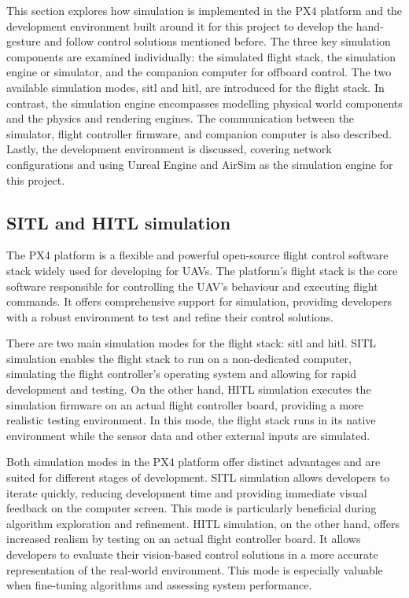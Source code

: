 This section explores how simulation is implemented in the PX4 platform and the development environment built around it for this project to develop the hand-gesture and follow control solutions mentioned before.
The three key simulation components are examined individually: the simulated flight stack, the simulation engine or simulator, and the companion computer for offboard control. 
The two available simulation modes, \acrfull{sitl} and \acrfull{hitl}, are introduced for the flight stack. In contrast, the simulation engine encompasses modelling physical world components and the physics and rendering engines. 
The communication between the simulator, flight controller firmware, and companion computer is also described. 
Lastly, the development environment is discussed, covering network configurations and using Unreal Engine and AirSim as the simulation engine for this project.

\subsection{SITL and HITL simulation}

The PX4 platform is a flexible and powerful open-source flight control software stack widely used for developing for UAVs. The platform’s flight stack is the core software responsible for controlling the UAV's behaviour and executing flight commands. It offers comprehensive support for simulation, providing developers with a robust environment to test and refine their control solutions.

There are two main simulation modes for the flight stack: \acrfull{sitl} and \acrfull{hitl}. SITL simulation enables the flight stack to run on a non-dedicated computer, simulating the flight controller’s operating system and allowing for rapid development and testing. On the other hand, HITL simulation executes the simulation firmware on an actual flight controller board, providing a more realistic testing environment. In this mode, the flight stack runs in its native environment while the sensor data and other external inputs are simulated.

Both simulation modes in the PX4 platform offer distinct advantages and are suited for different stages of development. SITL simulation allows developers to iterate quickly, reducing development time and providing immediate visual feedback on the computer screen. This mode is particularly beneficial during algorithm exploration and refinement. HITL simulation, on the other hand, offers increased realism by testing on an actual flight controller board. It allows developers to evaluate their vision-based control solutions in a more accurate representation of the real-world environment. This mode is especially valuable when fine-tuning algorithms and assessing system performance.

